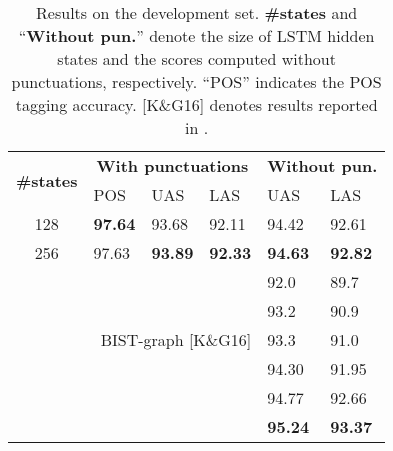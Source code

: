 \documentclass[11pt,letterpaper]{article}
\begin{document}
\begin{table}[!t]
\centering
\setlength{\tabcolsep}{0.25em}
\begin{tabular}{c|lll|ll}
\hline
\multirow{2}{*}{\bf \#states} &  \multicolumn{3}{c|}{\bf With punctuations} & \multicolumn{2}{c}{\bf Without pun.}  \\
\cline{2-6}
 & POS & UAS & LAS & UAS & LAS \\
\hline
 128 & \textbf{97.64} & 93.68 & 92.11 & 94.42 & 92.61 \\
 256 & 97.63 &  \textbf{93.89} & \textbf{92.33} & \textbf{94.63} & \textbf{92.82}\\
 \hline
 \hline
 \multicolumn{4}{r|}{ \protect{\citet{chen-manning:2014:EMNLP2014}} } & 92.0 & 89.7 \\
 \multicolumn{4}{r|}{ \protect{\citet{dyer-EtAl:2015:ACL-IJCNLP}} } & 93.2 & 90.9 \\
  \multicolumn{4}{r|}{BIST-graph [K\&G16]} & 93.3 & 91.0 \\
 \multicolumn{4}{r|}{ \citet{zhang-cheng-lapata:2017:EACLlong}} & 94.30 & 91.95 \\
  \multicolumn{4}{r|}{\citet{ma-hovy:2017:I17-1}} & 94.77 & 92.66\\
  \multicolumn{4}{r|}{ \protect{\citet{DozatM17}} } & \textbf{95.24} & \textbf{93.37} \\
 \hline
\end{tabular}
\caption{Results on the development set. \textbf{\#states} and ``\textbf{Without pun.}'' denote the size of LSTM hidden states and the scores computed without punctuations, respectively. ``POS'' indicates the POS tagging accuracy. [K\&G16]   denotes results reported in  .
}
\label{tab:devscores}
\end{table}
\end{document}
